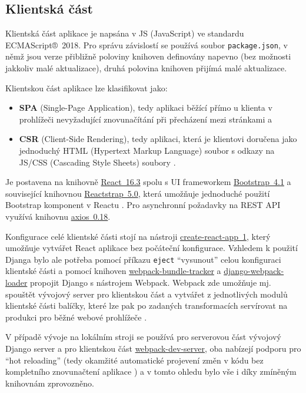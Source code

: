 \subsection{Klientská část}

Klientská část aplikace \cite{bp} je napsána v JS (JavaScript) ve standardu ECMAScript®~2018. Pro správu závislostí se používá soubor \verb|package.json|, v němž jsou verze přibližně poloviny knihoven definovány napevno (bez možnosti jakkoliv malé aktualizace), druhá polovina knihoven přijímá malé aktualizace. 

Klientskou část aplikace lze klasifikovat jako: 
\begin{itemize}
    \item \textbf{SPA} (Single-Page Application), tedy aplikaci běžící přímo u klienta v prohlížeči nevyžadující znovunačítání při přecházení mezi stránkami \cite{spa1} a
    \item \textbf{CSR} (Client-Side Rendering), tedy aplikaci, která je klientovi doručena jako jednoduchý HTML (Hypertext Markup Language) soubor s odkazy na JS/CSS (Cascading Style Sheets) soubory \cite{csr-ssr}.
\end{itemize}

Je postavena na knihovně \href{https://reactjs.org/}{React~16.3} spolu s UI frameworkem \href{https://getbootstrap.com}{Bootstrap~4.1} a související knihovnou \href{https://reactstrap.github.io/}{Reactstrap~5.0}, která umožňuje jednoduché použití Bootstrap komponent v Reactu \cite{reactstrap}. Pro asynchronní požadavky na REST API využívá knihovnu \href{https://github.com/axios/axios}{axios~0.18}. 

Konfigurace celé klientské části stojí na nástroji \href{https://github.com/facebook/create-react-app}{create-react-app~1}, který umožňuje \cite{cra} vytvářet React aplikace bez počáteční konfigurace. Vzhledem k použití Djanga bylo ale potřeba \cite{bp} pomocí příkazu \verb|eject| \enquote{vysunout} celou konfiguraci klientské části a pomocí knihoven \href{https://github.com/owais/webpack-bundle-tracker}{webpack-bundle-tracker} a  \href{https://github.com/owais/django-webpack-loader}{django-webpack-loader} propojit Django s nástrojem Webpack. Webpack zde umožňuje mj. spouštět vývojový server pro klientskou část a vytvářet z jednotlivých modulů klientské části balíčky, které lze pak po zadaných transformacích servírovat na produkci pro běžné webové prohlížeče \cite{webpack-ackee}.

V případě vývoje na lokálním stroji se používá \cite{bp} pro serverovou část vývojový Django server a pro klientskou část \href{https://github.com/webpack/webpack-dev-server}{webpack-dev-server}, oba nabízejí podporu pro \enquote{hot reloading} (tedy okamžité automatické projevení změn v kódu bez kompletního znovunačtení aplikace \cite{webpack-docs-hmr}) a v tomto ohledu bylo vše i díky zmíněným knihovnám zprovozněno.

